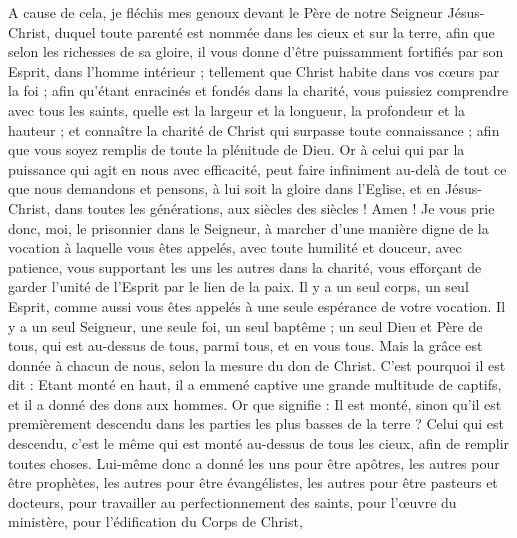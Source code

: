 \begin{multicols}{2}
A cause de cela, je fléchis mes genoux devant le Père de notre Seigneur Jésus-Christ,
duquel toute parenté est nommée dans les cieux et sur la terre,
afin que selon les richesses de sa gloire, il vous donne d'être puissamment fortifiés par son Esprit, dans l'homme intérieur ;
tellement que Christ habite dans vos cœurs par la foi ; afin qu'étant enracinés et fondés dans la charité,
vous puissiez comprendre avec tous les saints, quelle est la largeur et la longueur, la profondeur et la hauteur ;
et connaître la charité de Christ qui surpasse toute connaissance ; afin que vous soyez remplis de toute la plénitude de Dieu.
Or à celui qui par la puissance qui agit en nous avec efficacité, peut faire infiniment au-delà de tout ce que nous demandons et pensons,
à lui soit la gloire dans l'Eglise, et en Jésus-Christ, dans toutes les générations, aux siècles des siècles ! Amen !
\VerseOne{}Je vous prie donc, moi, le prisonnier dans le Seigneur, à marcher d'une manière digne de la vocation à laquelle vous êtes appelés,
avec toute humilité et douceur, avec patience, vous supportant les uns les autres dans la charité,
vous efforçant de garder l'unité de l'Esprit par le lien de la paix.
Il y a un seul corps, un seul Esprit, comme aussi vous êtes appelés à une seule espérance de votre vocation.
Il y a un seul Seigneur, une seule foi, un seul baptême ;
un seul Dieu et Père de tous, qui est au-dessus de tous, parmi tous, et en vous tous.
Mais la grâce est donnée à chacun de nous, selon la mesure du don de Christ.
C'est pourquoi il est dit : Etant monté en haut, il a emmené captive une grande multitude de captifs, et il a donné des dons aux hommes.
Or que signifie : Il est monté, sinon qu'il est premièrement descendu dans les parties les plus basses de la terre ?
Celui qui est descendu, c'est le même qui est monté au-dessus de tous les cieux, afin de remplir toutes choses.
Lui-même donc a donné les uns pour être apôtres, les autres pour être prophètes, les autres pour être évangélistes, les autres pour être pasteurs et docteurs,
pour travailler au perfectionnement des saints, pour l'œuvre du ministère, pour l'édification du Corps de Christ,

\end{multicols}
